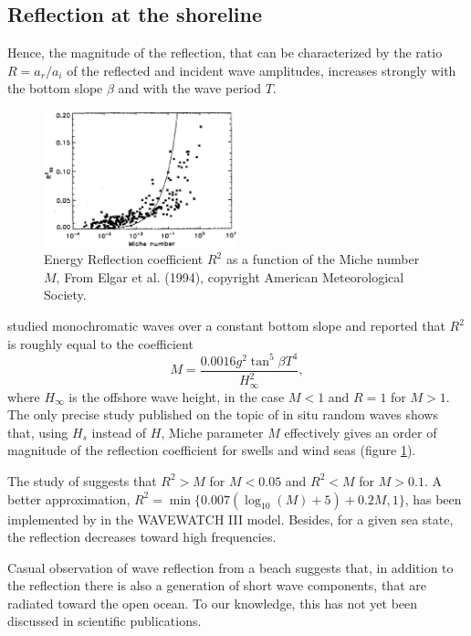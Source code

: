 \subsection{Reflection at the shoreline}
Hence, the magnitude of the reflection, that can be characterized by the ratio $R=a_r/a_i$ of the reflected and incident wave amplitudes, increases
strongly with the bottom slope $\beta$ and with the wave period $T$. 
\begin{figure}[htb]
\centerline{\includegraphics[width=0.5\textwidth]{FIGS_CH_SHALLOWLIN/R2_vs_Miche.png}}
  \caption{Energy Reflection coefficient $R^2$ as a function of the Miche number $M$, From Elgar et al. (1994), copyright American Meteorological Society.}
\label{fig:Miche_ref}
\end{figure}
\cite{Miche1951} studied monochromatic waves over a constant bottom slope
and reported that $R^2$ is roughly equal to the coefficient
\begin{equation}
M=\frac{0.0016 g^2 \tan^5 \beta  T^4}{H_{\infty}^2},
\end{equation}
where  $H_{\infty}$ is the offshore wave height, in the case $M < 1$ and $R=1$ for $M > 1$. 
The only precise study published on the topic of in situ random waves shows that, using $H_s$ instead of $H$, Miche parameter $M$
effectively gives an order of magnitude of the reflection coefficient for swells and wind seas (figure \ref{fig:Miche_ref}). 


The study of \cite{Elgar&al.1994} suggests that $R^2 > M$ for $M<0.05$ and $R^2 < M$ for $M>0.1$.
A better approximation, $R^2=\min\{0.007(\log_{10}(M)+5)+0.2 M,1\}$, has been implemented by \cite{Ardhuin&Roland2012} in the WAVEWATCH III model.
Besides, for a given sea state, the reflection decreases toward high frequencies. 

Casual observation of wave reflection from a beach suggests that, in addition to the reflection there is also a generation of short wave components, that 
are radiated toward the open ocean. To our knowledge, this has not yet been discussed in scientific publications. 


